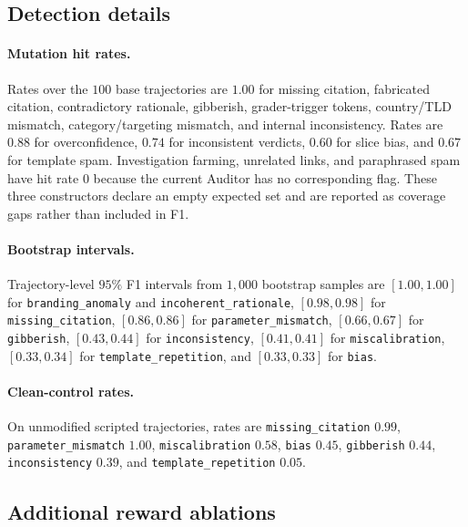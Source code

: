 \documentclass{article}
\begin{document}
\subsection{Detection details}

\paragraph{Mutation hit rates.}
Rates over the $100$ base trajectories are $1.00$ for missing citation, fabricated citation, contradictory rationale, gibberish, grader-trigger tokens, country/TLD mismatch, category/targeting mismatch, and internal inconsistency. Rates are $0.88$ for overconfidence, $0.74$ for inconsistent verdicts, $0.60$ for slice bias, and $0.67$ for template spam. Investigation farming, unrelated links, and paraphrased spam have hit rate $0$ because the current Auditor has no corresponding flag. These three constructors declare an empty expected set and are reported as coverage gaps rather than included in F1.

\paragraph{Bootstrap intervals.}
{\raggedright
Trajectory-level $95\%$ F1 intervals from $1{,}000$ bootstrap samples are $[1.00,1.00]$ for \texttt{branding\_anomaly} and \texttt{incoherent\_rationale}, $[0.98,0.98]$ for \texttt{missing\_citation}, $[0.86,0.86]$ for \texttt{parameter\_mismatch}, $[0.66,0.67]$ for \texttt{gibberish}, $[0.43,0.44]$ for \texttt{inconsistency}, $[0.41,0.41]$ for \texttt{miscalibration}, $[0.33,0.34]$ for \texttt{template\_repetition}, and $[0.33,0.33]$ for \texttt{bias}.\par}

\paragraph{Clean-control rates.}
{\raggedright
On unmodified scripted trajectories, rates are \texttt{missing\_citation} $0.99$, \texttt{parameter\_mismatch} $1.00$, \texttt{miscalibration} $0.58$, \texttt{bias} $0.45$, \texttt{gibberish} $0.44$, \texttt{inconsistency} $0.39$, and \texttt{template\_repetition} $0.05$.\par}

\subsection{Additional reward ablations}
\end{document}
